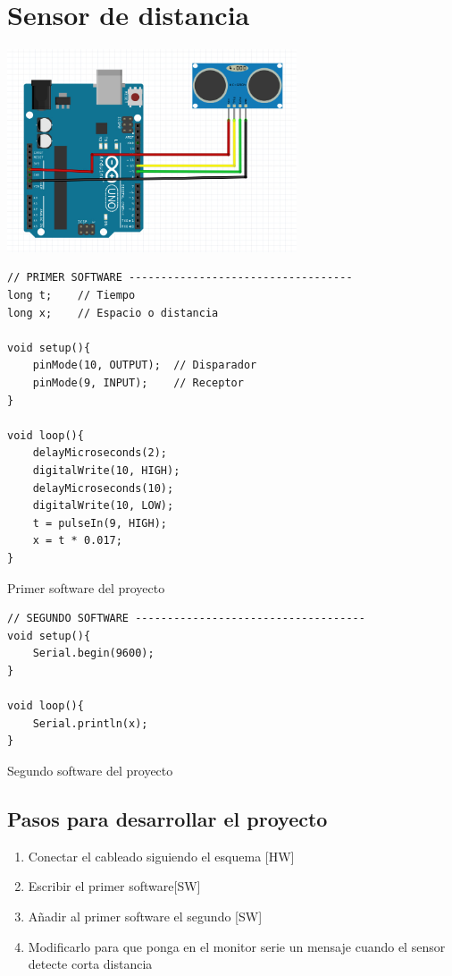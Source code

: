 \documentclass[11pt,spanish,a4paper]{article}
\begin{document}
\section{Sensor de distancia}

\begin{center}
\includegraphics[height=6cm]{img/09.jpg}
\end{center}

\begin{listing}[H]
\begin{verbatim}
// PRIMER SOFTWARE -----------------------------------
long t;    // Tiempo
long x;    // Espacio o distancia

void setup(){
    pinMode(10, OUTPUT);  // Disparador
    pinMode(9, INPUT);    // Receptor
}

void loop(){
    delayMicroseconds(2);
	digitalWrite(10, HIGH);
    delayMicroseconds(10);
    digitalWrite(10, LOW);
	t = pulseIn(9, HIGH);
	x = t * 0.017;
}
\end{verbatim}
	\caption{Primer software del proyecto \thesection}
\end{listing}


\begin{listing}[H]
\begin{verbatim}
// SEGUNDO SOFTWARE ------------------------------------
void setup(){
    Serial.begin(9600);
}

void loop(){
    Serial.println(x);
}
\end{verbatim}
	\caption{Segundo software del proyecto \thesection}
\end{listing}

\subsection{Pasos para desarrollar el proyecto}
\begin{enumerate}
	\item Conectar el cableado siguiendo el esquema [HW]
	\item Escribir el primer software[SW]
	\item Añadir al primer software el segundo [SW]
    \item Modificarlo para que ponga en el monitor serie un mensaje cuando el sensor detecte corta
		distancia
\end{enumerate}
\end{document}
